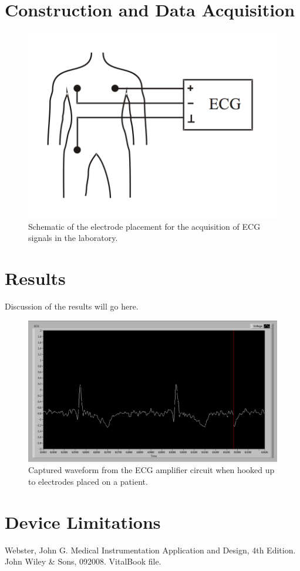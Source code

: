 \documentclass[pdftex,12pt,letterpaper]{article}
\begin{document}
\section{Construction and Data Acquisition}

\begin{figure}[H]
\begin{center}
\includegraphics[scale=.5]{setup.png}
\caption{Schematic of the electrode placement for the acquisition of ECG signals in the laboratory.}
\label{fig:setup}
\end{center}
\end{figure}

\section{Results}

Discussion of the results will go here.

\begin{figure}[H]
\begin{center}
\includegraphics[scale=.4]{ECG_real.png}
\caption{Captured waveform from the ECG amplifier circuit when hooked up to electrodes placed on a patient.}
\label{fig:ECG}
\end{center}
\end{figure}

\section{Device Limitations}

\begin{thebibliography}{1}

Webster, John G. Medical Instrumentation Application and Design, 4th Edition. John Wiley \& Sons, 092008. VitalBook file.

\end{thebibliography}
\end{document}
